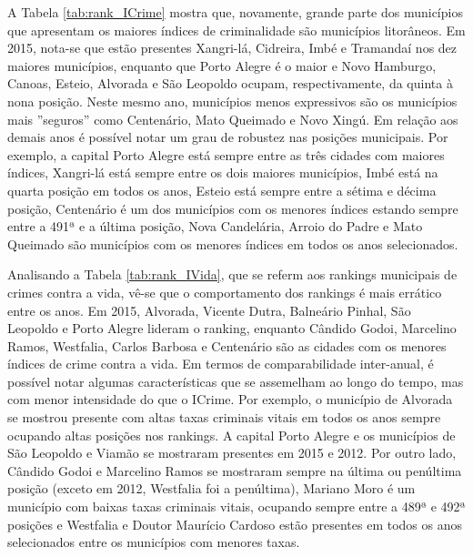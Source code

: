 \documentclass[12pt,openright,oneside,a4paper,english,french,spanish]{abntex2}
\numberwithin{table}{section} %
\numberwithin{figure}{section} %
\begin{document}
A Tabela \ref{tab:rank_ICrime} mostra que, novamente, grande parte dos municípios que apresentam os maiores índices de criminalidade são municípios litorâneos. Em 2015, nota-se que estão presentes Xangri-lá, Cidreira, Imbé e Tramandaí nos dez maiores municípios, enquanto que Porto Alegre é o maior e Novo Hamburgo, Canoas, Esteio, Alvorada e São Leopoldo ocupam, respectivamente, da quinta à nona posição. Neste mesmo ano, municípios menos expressivos são os municípios mais ''seguros'' como Centenário, Mato Queimado e Novo Xingú. Em relação aos demais anos é possível notar um grau de robustez nas posições municipais. Por exemplo, a capital Porto Alegre está sempre entre as três cidades com maiores índices, Xangri-lá está sempre entre os dois maiores municípios, Imbé está na quarta posição em todos os anos, Esteio está sempre entre a sétima e décima posição, Centenário é um dos municípios com os menores índices estando sempre entre a 491ª e a última posição, Nova Candelária, Arroio do Padre e Mato Queimado são municípios com os menores índices em todos os anos selecionados.

Analisando a Tabela \ref{tab:rank_IVida}, que se referm aos rankings municipais de crimes contra a vida, vê-se que o comportamento dos rankings é mais errático entre os anos. Em 2015, Alvorada, Vicente Dutra, Balneário Pinhal, São Leopoldo e Porto Alegre lideram o ranking, enquanto Cândido Godoi, Marcelino Ramos, Westfalia, Carlos Barbosa e Centenário são as cidades com os menores índices de crime contra a vida. Em termos de comparabilidade inter-anual, é possível notar algumas características que se assemelham ao longo do tempo, mas com menor intensidade do que o ICrime. Por exemplo, o município de Alvorada se mostrou presente com altas taxas criminais vitais em todos os anos sempre ocupando altas posições nos rankings. A capital Porto Alegre e os municípios de São Leopoldo e Viamão se mostraram presentes em 2015 e 2012. Por outro lado, Cândido Godoi e Marcelino Ramos se mostraram sempre na última ou penúltima posição (exceto em 2012, Westfalia foi a penúltima), Mariano Moro é um município com baixas taxas criminais vitais, ocupando sempre entre a 489ª e 492ª posições e Westfalia e Doutor Maurício Cardoso estão presentes em todos os anos selecionados entre os municípios com menores taxas.
\end{document}
